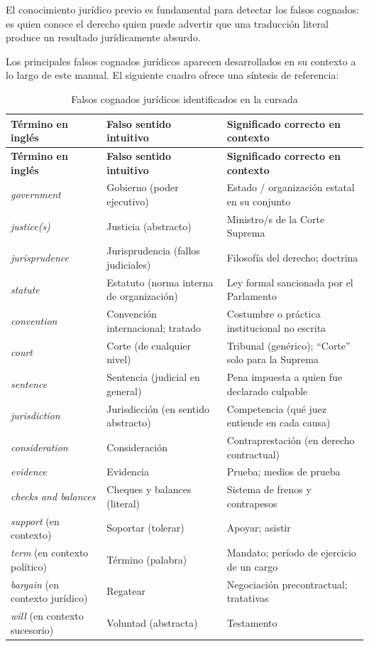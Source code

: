 \documentclass[12pt,oneside]{book}
\begin{document}
El conocimiento jurídico previo es fundamental para detectar los falsos cognados: es quien conoce el derecho quien puede advertir que una traducción literal produce un resultado jurídicamente absurdo.

Los principales falsos cognados jurídicos aparecen desarrollados en su contexto a lo largo de este manual. El siguiente cuadro ofrece una síntesis de referencia:

\begin{longtable}{
    >{\raggedright\arraybackslash}p{}
    >{\raggedright\arraybackslash}p{}
    >{\raggedright\arraybackslash}p{}
}
\caption{Falsos cognados jurídicos identificados en la cursada} \\
\toprule
\textbf{Término en inglés} & \textbf{Falso sentido intuitivo} & \textbf{Significado correcto en contexto} \\
\midrule
\endfirsthead
\toprule
\textbf{Término en inglés} & \textbf{Falso sentido intuitivo} & \textbf{Significado correcto en contexto} \\
\midrule
\endhead
\textit{government} & Gobierno (poder ejecutivo) & Estado / organización estatal en su conjunto \\
\textit{justice(s)} & Justicia (abstracto) & Ministro/s de la Corte Suprema \\
\textit{jurisprudence} & Jurisprudencia (fallos judiciales) & Filosofía del derecho; doctrina \\
\textit{statute} & Estatuto (norma interna de organización) & Ley formal sancionada por el Parlamento \\
\textit{convention} & Convención internacional; tratado & Costumbre o práctica institucional no escrita \\
\textit{court} & Corte (de cualquier nivel) & Tribunal (genérico); ``Corte'' solo para la Suprema \\
\textit{sentence} & Sentencia (judicial en general) & Pena impuesta a quien fue declarado culpable \\
\textit{jurisdiction} & Jurisdicción (en sentido abstracto) & Competencia (qué juez entiende en cada causa) \\
\textit{consideration} & Consideración & Contraprestación (en derecho contractual) \\
\textit{evidence} & Evidencia & Prueba; medios de prueba \\
\textit{checks and balances} & Cheques y balances (literal) & Sistema de frenos y contrapesos \\
\textit{support} (en contexto) & Soportar (tolerar) & Apoyar; asistir \\
\textit{term} (en contexto político) & Término (palabra) & Mandato; período de ejercicio de un cargo \\
\textit{bargain} (en contexto jurídico) & Regatear & Negociación precontractual; tratativas \\
\textit{will} (en contexto sucesorio) & Voluntad (abstracta) & Testamento \\
\bottomrule
\end{longtable}
\end{document}
